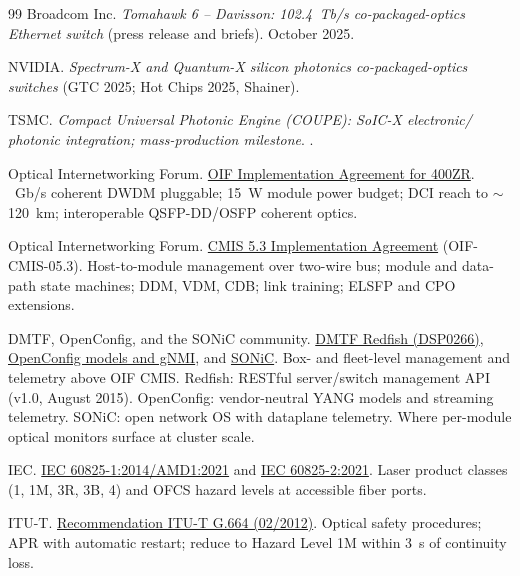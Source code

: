 \begin{thebibliography}{99}
Broadcom Inc.
\newblock \emph{Tomahawk 6 -- Davisson: 102.4~Tb/s co-packaged-optics Ethernet
switch} (press release and briefs).
\newblock October 2025.

NVIDIA.
\newblock \emph{Spectrum-X and Quantum-X silicon photonics co-packaged-optics
switches} (GTC 2025; Hot Chips 2025, Shainer).

TSMC.
\newblock \emph{Compact Universal Photonic Engine (COUPE): SoIC-X electronic/
photonic integration; mass-production milestone}.
.

Optical Internetworking Forum.
\newblock \href{https://www.oiforum.com/technical-work/400zr/}{OIF Implementation Agreement for 400ZR}.
~Gb/s coherent DWDM pluggable; 15~W module power budget; DCI reach to
$\sim$120~km; interoperable QSFP-DD/OSFP coherent optics.

Optical Internetworking Forum.
\newblock \href{https://www.oiforum.com/wp-content/uploads/OIF-CMIS-05.3.pdf}{CMIS 5.3 Implementation Agreement} (OIF-CMIS-05.3).
\newblock Host-to-module management over two-wire bus; module and data-path state
machines; DDM, VDM, CDB; link training; ELSFP and CPO extensions.

DMTF, OpenConfig, and the SONiC community.
\newblock \href{https://www.dmtf.org/standards/redfish}{DMTF Redfish (DSP0266)},
\href{https://www.openconfig.net/}{OpenConfig models and gNMI}, and
\href{https://sonicfoundation.dev/}{SONiC}.
\newblock Box- and fleet-level management and telemetry above OIF CMIS. Redfish:
RESTful server/switch management API (v1.0, August 2015). OpenConfig:
vendor-neutral YANG models and streaming telemetry. SONiC: open network OS with
dataplane telemetry. Where per-module optical monitors surface at cluster scale.

IEC.
\newblock \href{https://webstore.iec.ch/en/publication/74712}{IEC 60825-1:2014/AMD1:2021} and
\href{https://webstore.iec.ch/en/publication/66912}{IEC 60825-2:2021}.
\newblock Laser product classes (1, 1M, 3R, 3B, 4) and OFCS hazard levels at
accessible fiber ports.

ITU-T.
\newblock \href{https://www.itu.int/rec/T-REC-G.664-201202-I/en}{Recommendation ITU-T G.664 (02/2012)}.
\newblock Optical safety procedures; APR with automatic restart; reduce to Hazard
Level 1M within 3~s of continuity loss.


\end{thebibliography}
